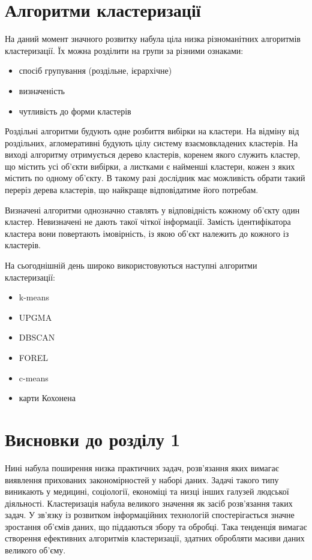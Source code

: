     
    
\section{Алгоритми кластеризації}
    На даний момент значного розвитку набула ціла низка різноманітних алгоритмів кластеризації. Їх можна розділити на групи за різними ознаками:
    \begin{itemize}
        \item спосіб групування (роздільне, ієрархічне)
        \item визначеність 
        \item чутливість до форми кластерів 
    \end{itemize}
    
    Роздільні алгоритми будують одне розбиття вибірки на кластери. На відміну від роздільних, агломеративні будують цілу систему взаємовкладених кластерів. На виході алгоритму отримується дерево кластерів, коренем якого служить кластер, що містить усі об'єкти вибірки, а листками є найменші кластери, кожен з яких містить по одному об’єкту. В такому разі дослідник має можливість обрати такий переріз дерева кластерів, що найкраще відповідатиме його потребам.
    
    Визначені алгоритми однозначно ставлять у відповідність кожному об'єкту один кластер. Невизначені не дають такої чіткої інформації. Замість ідентифікатора кластера вони повертають імовірність, із якою об'єкт належить до кожного із кластерів.
    
    На сьогоднішній день широко використовуються наступні алгоритми кластеризації:
    \begin{itemize}
        \item k-means \cite{Steinhaus, MacQueen}
        \item UPGMA \cite{SokalMichener}
        \item DBSCAN \cite{DBSCAN}
        \item FOREL \cite{Zagorujko}
        \item c-means
        \item карти Кохонена \cite{Rosenblatt}
    \end{itemize}
    
\section{Висновки до розділу 1}
    Нині набула поширення низка практичних задач, розв’язання яких вимагає виявлення прихованих закономірностей у наборі даних. Задачі такого типу виникають у медицині, соціології, економіці та низці інших галузей людської діяльності. Кластеризація набула великого значення як засіб розв’язання таких задач. У зв’язку із розвитком інформаційних технологій спостерігається значне зростання об’ємів даних, що піддаються збору та обробці. Така тенденція вимагає створення ефективних алгоритмів кластеризації, здатних обробляти масиви даних великого об’єму.
    
